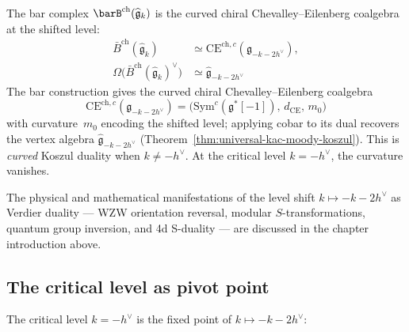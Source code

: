 The bar complex $\barB^{\mathrm{ch}}(\widehat{\mathfrak{g}}_k)$ is
the curved chiral Chevalley--Eilenberg coalgebra at the shifted level:
\begin{align}\label{eq:kac-moody-koszul-basic}
\bar{B}^{\mathrm{ch}}(\widehat{\mathfrak{g}}_k) &\simeq \mathrm{CE}^{\mathrm{ch},c}(\mathfrak{g}_{-k-2h^\vee}), \nonumber\\
\Omega\bigl(\bar{B}^{\mathrm{ch}}(\widehat{\mathfrak{g}}_k)^\vee\bigr) &\simeq \widehat{\mathfrak{g}}_{-k-2h^\vee}
\end{align}
The bar construction gives the curved chiral Chevalley--Eilenberg
coalgebra
\[
\mathrm{CE}^{\mathrm{ch},c}(\mathfrak{g}_{-k-2h^\vee})
= \bigl(\mathrm{Sym}^c(\mathfrak{g}^*[-1]),\, d_{\mathrm{CE}},\, m_0\bigr)
\]
with curvature~$m_0$ encoding the shifted level; applying cobar
to its dual recovers the vertex algebra
$\widehat{\mathfrak{g}}_{-k-2h^\vee}$
(Theorem~\ref{thm:universal-kac-moody-koszul}).
This is \emph{curved} Koszul duality when $k \neq -h^\vee$.
At the critical level $k = -h^\vee$, the curvature vanishes.

\begin{remark}
The physical and mathematical manifestations of the level shift
$k \mapsto -k - 2h^\vee$ as Verdier duality --- WZW orientation
reversal, modular $S$-transformations, quantum group inversion,
and 4d S-duality --- are discussed in the chapter introduction above.
\end{remark}

\subsection{The critical level as pivot point}

The critical level $k = -h^\vee$ is the fixed point of $k \mapsto -k-2h^\vee$:

